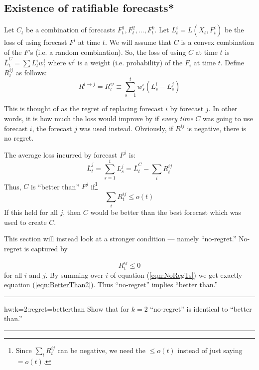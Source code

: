 \documentclass{book}
\newcommand{\gray}{  }
\newenvironment{textHW}{
  \noindent\rule{\textwidth}{1pt}%
  \begin{list}{}{
      \setlength{\labelwidth}{1cm}
      \setlength{\labelsep}{0.3cm}
      \setlength{\leftmargin}{1.3cm}
      \setlength{\rightmargin}{1cm}
      \setlength{\parsep}{0.5ex plus0.2ex minus0.1ex}
      \setlength{\topsep}{1pt plus3pt minus1pt}
      \setlength{\itemsep}{0ex plus0.2ex} 
      \renewcommand{\makelabel}[1]{\label{thw:##1}{\ref{##1}}}
      \sl}}%
  {\end{list}\rule{\textwidth}{1pt}}
\begin{document}
\gray
        \subsection{Existence of ratifiable forecasts*}
%
Let $C_t$ be a combination of forecasts $F^1_t,F^2_t,\ldots,F^k_t$.
Let $L^i_t = L(X_t,F^i_t)$ be the loss of using forecast $F^i$ at time
$t$.  We will assume that $C$ is a convex combination of the $F$'s
(i.e. a random combination).  So, the loss of using $C$ at time $t$ is
$\bar{L}^C_t = \sum L^i_t w^i_t$ where $w^i$ is a weight (i.e.
probability) of the $F_i$ at time $t$.  Define $R^{ij}_t$ as follows:
\begin{equation}
  R^{i \rightarrow j} = R^{ij}_t \equiv \sum_{s=1}^t w^i_s (L^i_s -
  L^j_s)
  \label{def:pairwise_regret}
\end{equation}

This is thought of as the regret of replacing forecast $i$ by
forecast $j$.  In other words, it is how much the loss would improve
by if {\it every time} $C$ was going to use forecast $i$, the forecast
$j$ was used instead.  Obviously, if $R^{ij}$ is negative, there is no
regret. 

The average loss incurred by forecast $F^j$ is:
\begin{equation}
  \label{eqn:BetterThan}
  \bar{L}^j_t = \sum_{s=1}^t L_s^j =  \bar{L}^C_t - \sum_i R^{ij}_t 
\end{equation} 
Thus, $C$ is ``better than'' $F^j$ if\footnote{Since $\sum_i R^{ij}_t$
  can be negative, we need the $\le o(t)$ instead of just saying $=
  o(t)$.}
\begin{equation}
\sum_i R^{ij}_t \le o(t)
  \label{eqn:BetterThan2}
\end{equation}
  If this held for all
$j$, then $C$ would be better than the best forecast which was used to
create $C$.

This section will instead look at a stronger condition --- namely
``no-regret.''  No-regret is captured by

\begin{equation}
  R^{ij}_t \dot{\le} 0
  \label{eqn:NoRegTs}
\end{equation}
for all $i$ and $j$.  By summing over $i$ of equation
(\ref{eqn:NoRegTs}) we get exactly equation (\ref{eqn:BetterThan2}).  Thus
``no-regret'' implies ``better than.''

\begin{textHW}
\item[hw:k=2:regret=betterthan] Show that for $k=2$ ``no-regret'' is
  identical to ``better than.''
\end{textHW}
\end{document}
